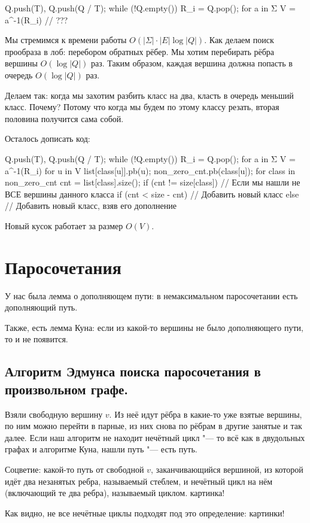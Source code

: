 \begin{abstractcode}
Q.push(T), Q.push(Q / T);
while (!Q.empty()) {
	R_i = Q.pop();
	for a in Σ {
		V = a^{-1}(R_i)
		// ???
	}
}
\end{abstractcode}
Мы стремимся к времени работы $O(|Σ| \cdot |E| \log |Q|)$.
Как делаем поиск прообраза в лоб: перебором обратных рёбер.
Мы хотим перебирать рёбра вершины $O(\log |Q|)$ раз.
Таким образом, каждая вершина должна попасть в очередь
$O(\log |Q|)$ раз.

Делаем так: когда мы захотим разбить класс на два, класть в очередь меньший класс.
Почему? Потому что когда мы будем по этому классу резать, вторая половина получится сама собой.

Осталось дописать код:
\begin{abstractcode}
Q.push(T), Q.push(Q / T);
while (!Q.empty()) {
	R_i = Q.pop();
	for a in Σ {
		V = a^{-1}(R_i)
		for u in V {
			list[class[u]].pb(u);
			non_zero_cnt.pb(class[u]);
		}
		for class in non_zero_cnt {
			cnt = list[class].size();
			if (cnt != size[class]) {
				// Если мы нашли не ВСЕ вершины данного класса
				if (cnt < size - cnt) {
					// Добавить новый класс
				} else {
					// Добавить новый класс, взяв его дополнение
				}
			}
		}
	}
}
\end{abstractcode}
Новый кусок работает за размер $O(V)$.

\section{Паросочетания}

У нас была лемма о дополняющем пути: в немаксимальном паросочетании есть дополняющий путь.

Также, есть лемма Куна: если из какой-то вершины не было дополняющего пути, то и не появится.

\subsection{Алгоритм Эдмунса поиска паросочетания в произвольном графе.}

Взяли свободную вершину $v$.
Из неё идут рёбра в какие-то уже взятые вершины, по ним можно перейти в парные, из них снова по рёбрам в другие занятые и так далее.
Если наш алгоритм не находит нечётный цикл "--- то всё как в двудольных графах и алгоритме Куна, нашли путь "--- есть путь.
\begin{Def}
	Соцветие: какой-то путь от свободной $v$, заканчивающийся вершиной,
	из которой идёт два незанятых ребра, называемый стеблем,
	и нечётный цикл на нём (включающий те два ребра), называемый циклом. \TODO картинка!
\end{Def}
Как видно, не все нечётные циклы подходят под это определение: \TODO картинки!

